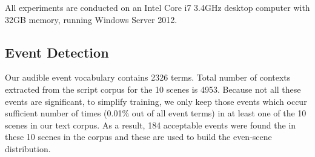 All experiments are conducted on an 
Intel Core i7 3.4GHz desktop computer with 32GB memory, 
running Windows Server 2012.

\subsection{Event Detection}
Our audible event vocabulary contains 2326 terms.
Total number of contexts extracted from the script corpus
for the 10 scenes is 4953.
Because not all these events are significant,
to simplify training, we only keep those events which occur
sufficient number of times (0.01\% out of all event terms)
in at least one of the 10 scenes in our text corpus.
As a result, 184 acceptable events were found the in these 10 scenes
in the corpus and these are used to build the even-scene distribution.

